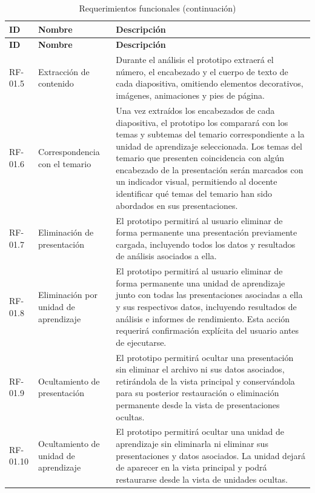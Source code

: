 \documentclass[11pt]{article}
\begin{document}
\begin{longtable}{|L{1.8cm}|L{4.2cm}|L{8.1cm}|}
        \caption{Requerimientos funcionales (continuación)}\\
        \hline
        \textbf{ID} & \textbf{Nombre} & \textbf{Descripción} \\
        \hline
        \endfirsthead
        \hline
        \textbf{ID} & \textbf{Nombre} & \textbf{Descripción} \\
        \hline
        \endhead
        RF-01.5 & Extracción de contenido & Durante el análisis el prototipo extraerá el número, el encabezado y el cuerpo de texto de cada diapositiva, omitiendo elementos decorativos, imágenes, animaciones y pies de página. \\
        \hline
        RF-01.6 & Correspondencia con el temario & Una vez extraídos los encabezados de cada diapositiva, el prototipo los comparará con los temas y subtemas del temario correspondiente a la unidad de aprendizaje seleccionada. Los temas del temario que presenten coincidencia con algún encabezado de la presentación serán marcados con un indicador visual, permitiendo al docente identificar qué temas del temario han sido abordados en sus presentaciones. \\
        \hline
        RF-01.7 & Eliminación de presentación & El prototipo permitirá al usuario eliminar de forma permanente una presentación previamente cargada, incluyendo todos los datos y resultados de análisis asociados a ella. \\
        \hline
        RF-01.8 & Eliminación por unidad de aprendizaje & El prototipo permitirá al usuario eliminar de forma permanente una unidad de aprendizaje junto con todas las presentaciones asociadas a ella y sus respectivos datos, incluyendo resultados de análisis e informes de rendimiento. Esta acción requerirá confirmación explícita del usuario antes de ejecutarse. \\
        \hline
        RF-01.9 & Ocultamiento de presentación & El prototipo permitirá ocultar una presentación sin eliminar el archivo ni sus datos asociados, retirándola de la vista principal y conservándola para su posterior restauración o eliminación permanente desde la vista de presentaciones ocultas. \\
        \hline
        RF-01.10 & Ocultamiento de unidad de aprendizaje & El prototipo permitirá ocultar una unidad de aprendizaje sin eliminarla ni eliminar sus presentaciones y datos asociados. La unidad dejará de aparecer en la vista principal y podrá restaurarse desde la vista de unidades ocultas. \\

\end{longtable}
\end{document}
